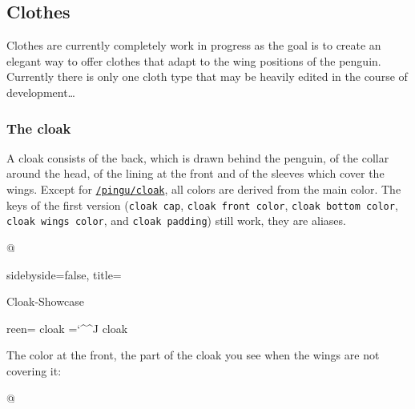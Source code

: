 \documentclass[parskip=half,english,numbers=noenddot,footnotes=nomultiple,oneside,fontsize=10pt,DIV=15,headinclude]{scrartcl}
\makeatletter
\def\pingu@listing@text{}
\def\lpingu#1{\begingroup\def\pingu@listing@text{#1}\lstinline[style=lstpingu,breakatwhitespace]'#1'\endgroup}
\newif\ifpingu@nexttitle
\newcommand*\keyref[2][/pingu/]{\hyperref[pk:#1#2]{\lpingu{#1#2}}}
\def\pingu@nl{^^J}{\catcode`\^^I=12 \gdef\pingu@tab{^^I}}
\def\pingu@keyof#1=#2\@nil{\def\pingu@linekey{#1}}
\def\pingu@keyline#1#2#3#4#5{%
	\pingu@keyof#3=\@nil
	\global\pingu@nexttitletrue
	\ifx\relax#1\relax\expandafter\keyexplain\expandafter{\pingu@linekey}{#4}{#5}%
	\else\expandafter\pingu@subkeyline@open\expandafter{\pingu@linekey}{#1}{#4}{#5}\fi
	\begingroup\newlinechar=`\^^J%
	\edef\pingu@src{\string\begin{tcblisting}{@}\string\begin{tikzpicture}\pingu@nl\pingu@tab\string\pingu[%
		\ifx\relax#1\relax\else\detokenize{#1}, \fi\ifx\relax#2\relax\else\detokenize{#2}, \fi\detokenize{#3}]\pingu@nl\string\end{tikzpicture}\string\end{tcblisting}\pingu@nl}%
	\expandafter\scantokens\expandafter{\pingu@src}\endgroup
	\ifx\relax#1\relax\endkeyexplain\else\endsubkeyexplain\fi}
\def\pingu@subkeyline@open#1#2#3#4{\subkeyexplain{#2}{#1}{#3}{#4}}
\newcommand\subkeyline[5][]{\pingu@keyline{#2}{#1}{#3}{#4}{#5}}
\makeatother
\begin{document}
{{{{{{\subsection{Clothes}

Clothes are currently completely work in progress as the goal is to create an elegant way to offer clothes that adapt to the wing positions of the penguin.
Currently there is only one cloth type that may be heavily edited in the course of development\ldots

\subsubsection{The cloak}

A cloak consists of the back, which is drawn behind the penguin, of the collar around the head, of the lining at the front and of the sleeves which cover the wings. Except for \keyref{cloak}, all colors are derived from the main color. The keys of the first version (\texttt{cloak cap}, \texttt{cloak front color}, \texttt{cloak bottom color}, \texttt{cloak wings color}, and \texttt{cloak padding}) still work, they are aliases.

\begin{tcblisting}{@}
\begin{tikzpicture}
	\pingu[cloak=green]
\end{tikzpicture}
\end{tcblisting}
\endshowkeyexplain

\begin{tcblisting}{sidebyside=false, title={\strut Cloak-Showcase}}
\end{tcblisting}

\subkeyline{cloak}{cloak collar=green}{color}{}

The color at the front, the part of the cloak you see when the wings are not covering it:
\begin{tcblisting}{@}
\begin{tikzpicture}
	\pingu[cloak, cloak lining=green]
\end{tikzpicture}
\end{tcblisting}
\endsubkeyexplain

}}}}}}
\end{document}
